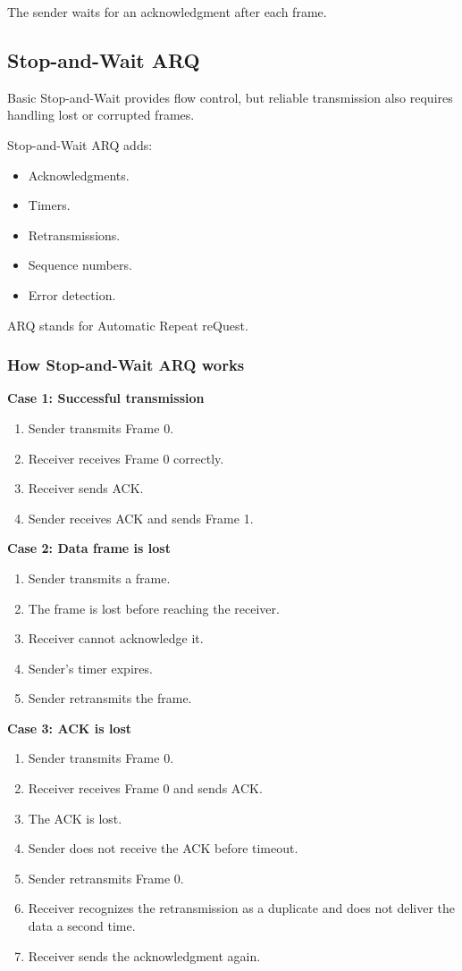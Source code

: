 The sender waits for an acknowledgment after each frame.

\subsection{Stop-and-Wait ARQ}

Basic Stop-and-Wait provides flow control, but reliable transmission also requires handling lost or corrupted frames.

Stop-and-Wait ARQ adds:

\begin{itemize}
\item Acknowledgments.
\item Timers.
\item Retransmissions.
\item Sequence numbers.
\item Error detection.
\end{itemize}

ARQ stands for Automatic Repeat reQuest.

\subsubsection{How Stop-and-Wait ARQ works}

\textbf{Case 1: Successful transmission}

\begin{enumerate}
\item Sender transmits Frame 0.
\item Receiver receives Frame 0 correctly.
\item Receiver sends ACK.
\item Sender receives ACK and sends Frame 1.
\end{enumerate}

\textbf{Case 2: Data frame is lost}

\begin{enumerate}
\item Sender transmits a frame.
\item The frame is lost before reaching the receiver.
\item Receiver cannot acknowledge it.
\item Sender's timer expires.
\item Sender retransmits the frame.
\end{enumerate}

\textbf{Case 3: ACK is lost}

\begin{enumerate}
\item Sender transmits Frame 0.
\item Receiver receives Frame 0 and sends ACK.
\item The ACK is lost.
\item Sender does not receive the ACK before timeout.
\item Sender retransmits Frame 0.
\item Receiver recognizes the retransmission as a duplicate and does not deliver the data a second time.
\item Receiver sends the acknowledgment again.
\end{enumerate}


